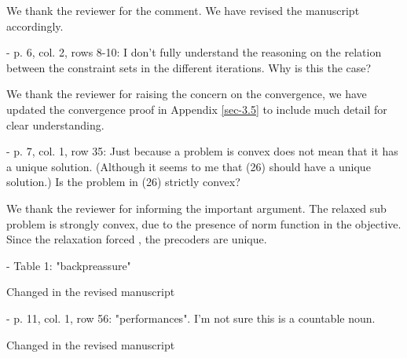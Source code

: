 \resp We thank the reviewer for the comment. We have revised the manuscript accordingly.

 - p. 6, col. 2, rows 8-10: I don't fully understand the reasoning on the relation between the constraint sets in the different iterations. Why is this the case?

\resp We thank the reviewer for raising the concern on the convergence, we have updated the convergence proof in Appendix \ref{sec-3.5} to include much detail for clear understanding.


 - p. 7, col. 1, row 35: Just because a problem is convex does not mean that it has a unique solution. (Although it seems to me that (26) should have a unique solution.) Is the problem in (26) strictly convex?

\resp We thank the reviewer for informing the important argument. The relaxed sub problem is strongly convex, due to the presence of norm function in the objective. Since the relaxation forced , the precoders are unique.

 - Table 1: "backpreassure"

\resp Changed in the revised manuscript

 - p. 11, col. 1, row 56: "performances". I'm not sure this is a countable noun.

\resp Changed in the revised manuscript

